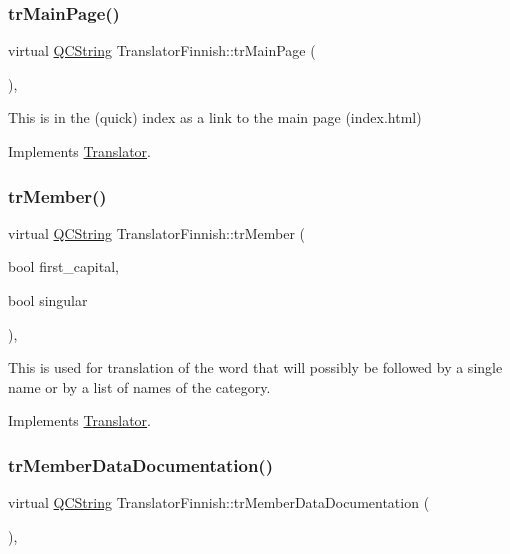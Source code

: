 \subsubsection{\texorpdfstring{trMainPage()}{trMainPage()}}
{\footnotesize\ttfamily virtual \mbox{\hyperlink{class_q_c_string}{Q\+C\+String}} Translator\+Finnish\+::tr\+Main\+Page (\begin{DoxyParamCaption}{ }\end{DoxyParamCaption})\hspace{0.3cm}{\ttfamily [inline]}, {\ttfamily [virtual]}}

This is in the (quick) index as a link to the main page (index.\+html) 

Implements \mbox{\hyperlink{class_translator}{Translator}}.

\mbox{\label{class_translator_finnish_a8248ed16c346bc4a101b8d2b2872bd8c}} 
\subsubsection{\texorpdfstring{trMember()}{trMember()}}
{\footnotesize\ttfamily virtual \mbox{\hyperlink{class_q_c_string}{Q\+C\+String}} Translator\+Finnish\+::tr\+Member (\begin{DoxyParamCaption}\item[{bool}]{first\+\_\+capital,  }\item[{bool}]{singular }\end{DoxyParamCaption})\hspace{0.3cm}{\ttfamily [inline]}, {\ttfamily [virtual]}}

This is used for translation of the word that will possibly be followed by a single name or by a list of names of the category. 

Implements \mbox{\hyperlink{class_translator}{Translator}}.

\mbox{\label{class_translator_finnish_a30b0789e5c34496144a1c225eff2d5e6}} 
\subsubsection{\texorpdfstring{trMemberDataDocumentation()}{trMemberDataDocumentation()}}
{\footnotesize\ttfamily virtual \mbox{\hyperlink{class_q_c_string}{Q\+C\+String}} Translator\+Finnish\+::tr\+Member\+Data\+Documentation (\begin{DoxyParamCaption}{ }\end{DoxyParamCaption})\hspace{0.3cm}{\ttfamily [inline]}, {\ttfamily [virtual]}}

